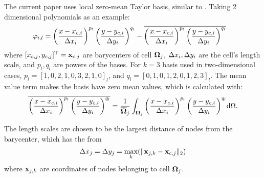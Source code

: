 The current paper uses local zero-mean Taylor basis, similar to
\cite{wang2017compact_VR}.
Taking 2 dimensional polynomials as an example:
\begin{equation}
    \begin{aligned}
        \varphi_{i,l} & =
        \left(\frac{x - x_{c,i}}{{\Delta} x_i}\right)^{p_l}
        \left(\frac{y - y_{c,i}}{{\Delta} y_i}\right)^{q_l}
        -
        \overline{
            \left(\frac{x - x_{c,i}}{{\Delta} x_i}\right)^{p_l}
            \left(\frac{y - y_{c,i}}{{\Delta} y_i}\right)^{q_l}
        }
    \end{aligned}
\end{equation}
where $[x_{c,j},y_{c,j}]^\mathrm{T} = \mathbf{x}_{c,j}$ are barycenters of cell $\mathbf{\Omega}_{j}$,
${\Delta} x_i,{\Delta} y_i$ are the cell's length scale, and $p_l,q_l$ are
powers of the bases. For $k=3$ basis used in two-dimensional cases,
$p_l=[1,0,2,1,0,3,2,1,0]_l$,
and $q_l=[0,1,0,1,2,0,1,2,3]_l$.
The mean value term makes the basis have zero mean values,
which is calculated with:
\begin{equation}
    \overline{
        \left(\frac{x - x_{c,i}}{{\Delta} x_i}\right)^{p_l}
        \left(\frac{y - y_{c,i}}{{\Delta} y_i}\right)^{q_l}
    }
    =
    \frac{1}{\overline{\mathbf{\Omega}}_j}\int_{\mathbf{\Omega}_j}{
        \left(\frac{x - x_{c,i}}{{\Delta} x_i}\right)^{p_l}
        \left(\frac{y - y_{c,i}}{{\Delta} y_i}\right)^{q_l}
    }\dd \Omega .
\end{equation}

The length scales are chosen to be the largest distance of nodes from the
barycenter, which has the from
\begin{equation}
    {\Delta} x_j = {\Delta} y_j = \max_k(\|\mathbf{x}_{j,k} - \mathbf{x}_{c,j}\|_2)
\end{equation}
where $\mathbf{x}_{j,k}$ are coordinates of nodes belonging to cell $\mathbf{\Omega}_{j}$.

